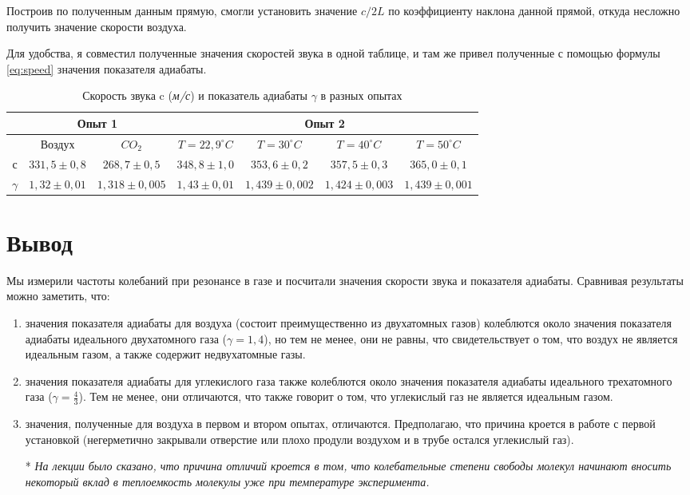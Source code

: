 \documentclass[12pt]{article}
\begin{document}
Построив по полученным данным прямую, смогли установить значение $c/2L$ по коэффициенту наклона данной прямой, откуда несложно получить значение скорости воздуха.

Для удобства, я совместил полученные значения скоростей звука в одной таблице, и там же привел полученные с помощью формулы \ref{eq:speed} значения показателя адиабаты.
\noindent
\begin{table}[h]

	\begin{tabular}{|c|c|c|c|c|c|c|}
		\hline
		&\multicolumn{2}{c|}{Опыт 1} & \multicolumn{4}{|c|}{Опыт 2}\\
		\hline
		&Воздух & $CO_2$ & $T=22,9 ^{\circ} C$ & $T=30 ^{\circ} C$ & $ T =40 ^{\circ} C$ & $T=50 ^{\circ} C$\\
		\hline
		с &$331,5 \pm 0,8$ & $268,7 \pm 0,5$ & $348,8 \pm 1,0$ & $353,6 \pm 0,2$ & $357,5 \pm 0,3$ & $365,0 \pm 0,1$\\
		\hline
		$\gamma$ & $1,32 \pm 0,01$ & $1,318 \pm 0,005$ & $1,43 \pm 0,01$ & $1,439 \pm 0,002$ & $ 1,424 \pm 0,003$ & $1,439 \pm 0,001$\\
		\hline 
		\end{tabular}
	\caption{Скорость звука c (\textit{м/с}) и показатель адиабаты $\gamma$ в разных опытах }
\end{table}

\section*{Вывод}
Мы измерили частоты колебаний при резонансе в газе и посчитали значения скорости звука и показателя адиабаты. Сравнивая результаты можно заметить, что:
\begin{enumerate}
	\item значения показателя адиабаты для воздуха (состоит преимущественно из двухатомных газов) колеблются около значения показателя адиабаты идеального двухатомного газа ($\gamma = 1,4$), но тем не менее, они не равны, что свидетельствует о том, что воздух не является идеальным газом, а также содержит недвухатомные газы.
	\item значения показателя адиабаты для углекислого газа также колеблются около значения показателя адиабаты идеального трехатомного газа ($\gamma = \frac{4}{3}$). Тем не менее, они отличаются, что также говорит о том, что углекислый газ не является идеальным газом.
	\item значения, полученные для воздуха в первом и втором опытах, отличаются. Предполагаю, что причина кроется в работе с первой установкой (негерметично закрывали отверстие или плохо продули воздухом и в трубе остался углекислый газ).
	\item[*] \textit{На лекции было сказано, что причина отличий кроется в том, что колебательные степени свободы молекул начинают вносить некоторый вклад в теплоемкость молекулы уже при температуре эксперимента.}
\end{enumerate}
\end{document}
